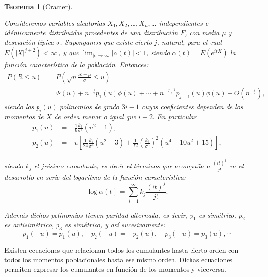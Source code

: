 \documentclass[
]{book}
\theoremstyle{break}
\newtheorem{theorem}{Teorema}[chapter]
\theoremstyle{definition}
\theoremstyle{definition}
\theoremstyle{definition}
\theoremstyle{definition}
\theoremstyle{remark}
\begin{document}
\begin{theorem}[Cramer]
\protect\hypertarget{thm:aprox-cramer}{}{\label{thm:aprox-cramer} \iffalse (Cramer) \fi{} } \vspace{0.5cm}

Consideremos variables aleatorias
\(X_1,X_2,\ldots ,X_n,\ldots\) independientes e idénticamente
distribuidas procedentes de una distribución \(F\), con media \(\mu\) y
desviación típica \(\sigma\). Supongamos que existe cierto \(j\), natural,
para el cual \(E\left( \left\vert X\right\vert^{j+2} \right) <\infty \,\), y que \(\lim_{\left\vert t\right\vert \rightarrow \infty }\left\vert \alpha \left( t \right) \right\vert <1\), siendo \(\alpha \left( t \right) =E\left( e^{itX} \right)\) la función característica de la población.
Entonces:
\[\begin{aligned}
P\left( R\leq u \right) &=P\left( \sqrt{n}\frac{\bar{X}-\mu }{\sigma }
\leq u \right) \\
&= \Phi \left( u \right) +n^{-\frac{1}{2}}p_1\left( u \right) \phi \left(
u \right) +\cdots +n^{-\frac{j-1}{2}}p_{j-1}\left( u \right) \phi \left(
u \right) +O\left( n^{-\frac{j}{2}} \right),
\end{aligned}\]
siendo los \(p_i\left( u \right)\) polinomios de grado \(3i-1\) cuyos coeficientes
dependen de los momentos de \(X\) de orden menor o igual que \(i+2\).
En particular
\[\begin{aligned}
p_1\left( u \right) &= -\frac{1}{6}\frac{k_3}{\sigma^{3}}\left(
u^2-1 \right), \\
p_2\left( u \right) &= -u\left[ \frac{1}{24}\frac{k_4}{\sigma^{4}}\left(
u^2-3 \right) +\frac{1}{72}\left( \frac{k_3}{\sigma^{3}} \right)
^2\left( u^{4}-10u^2+15 \right) \right] ,
\end{aligned}\]

siendo \(k_j\) el \(j\)-ésimo cumulante, es decir el términos que acompaña
a \(\frac{\left( it \right)^{j}}{j!}\) en el desarrollo en serie del
logaritmo de la función característica:
\[\log \alpha \left( t \right) =\sum_{j=1}^{\infty }k_j\frac{\left( it \right)
^{j}}{j!}.\]

Además dichos polinomios tienen paridad alternada, es
decir, \(p_1\) es simétrico, \(p_2\) es antisimétrico, \(p_3\) es
simétrico, y así sucesivamente:
\[p_1\left( -u \right) = p_1\left( u \right),\quad p_2\left( -u \right)
= -p_2\left( u \right),\quad p_3\left( -u \right) = p_3\left( u \right)
,\cdots\]
\end{theorem}

Existen ecuaciones que relacionan todos los cumulantes hasta cierto
orden con todos los momentos poblacionales hasta ese mismo orden. Dichas
ecuaciones permiten expresar los cumulantes en función de los momentos y
viceversa.
\end{document}
